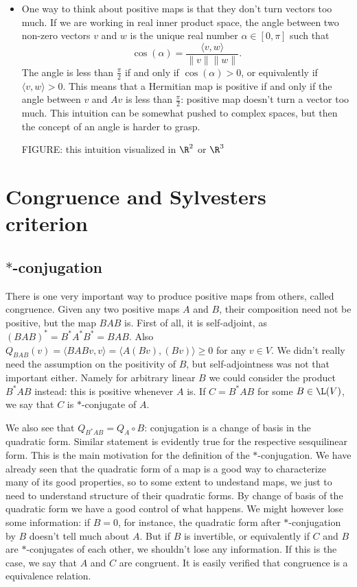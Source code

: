 \begin{itemize}
	\item One way to think about positive maps is that they don't turn vectors too much. If we are working in real inner product space, the angle between two non-zero vectors $v$ and $w$ is the unique real number $\alpha \in [0, \pi]$ such that
	\[
		\cos(\alpha) = \frac{\langle v, w\rangle}{\|v\| \|w\|}.
	\]
	The angle is less than $\frac{\pi}{2}$ if and only if $\cos(\alpha) > 0$, or equivalently if $\langle v, w \rangle > 0$. This means that a Hermitian map is positive if and only if the angle between $v$ and $A v$ is less than $\frac{\pi}{2}$: positive map doesn't turn a vector too much. This intuition can be somewhat pushed to complex spaces, but then the concept of an angle is harder to grasp.

	FIGURE: this intuition visualized in $\R^{2}$ or $\R^{3}$
\end{itemize}

\section{Congruence and Sylvesters criterion}

\subsection{$*$-conjugation}

There is one very important way to produce positive maps from others, called congruence. Given any two positive maps $A$ and $B$, their composition need not be positive, but the map $BAB$ is. First of all, it is self-adjoint, as $(BAB)^{*} = B^{*} A^{*} B^{*} = BAB$. Also $Q_{BAB}(v) = \langle BAB v, v \rangle = \langle A (B v), (B v) \rangle \geq 0$ for any $v \in V$. We didn't really need the assumption on the positivity of $B$, but self-adjointness was not that important either. Namely for arbitrary linear $B$ we could consider the product $B^{*}AB$ instead: this is positive whenever $A$ is. If $C = B^{*}AB$ for some $B \in \L(V)$, we say that $C$ is $*$-conjugate of $A$.

We also see that $Q_{B^{*}AB} = Q_{A} \circ B$: conjugation is a change of basis in the quadratic form. Similar statement is evidently true for the respective sesquilinear form. This is the main motivation for the definition of the $*$-conjugation. We have already seen that the quadratic form of a map is a good way to characterize many of its good properties, so to some extent to undestand maps, we just to need to understand structure of their quadratic forms. By change of basis of the quadratic form we have a good control of what happens. We might however lose some information: if $B = 0$, for instance, the quadratic form after $*$-conjugation by $B$ doesn't tell much about $A$. But if $B$ is invertible, or equivalently if $C$ and $B$ are $*$-conjugates of each other, we shouldn't lose any information. If this is the case, we say that $A$ and $C$ are congruent. It is easily verified that congruence is a equivalence relation.

